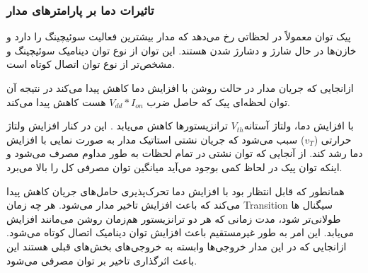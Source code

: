 \subsubsection{تاثیرات دما بر پارامتر‌های مدار}


پیک توان معمولاً در لحظاتی رخ می‌دهد که مدار بیشترین فعالیت سوئیچینگ را دارد و خازن‌ها در حال شارژ و دشارژ شدن هستند. این توان از نوع توان دینامیک سوئیچینگ و مشخص‌تر از نوع توان اتصال کوتاه است.

ازانجایی که جریان مدار در حالت روشن با افزایش دما کاهش پیدا می‌کند در نتیجه آن توان لحظه‌ای پیک که حاصل ضرب $V_{dd} * I_{on}$ هست کاهش پیدا می‌کند.



با افزایش دما، ولتاژ آستانه$V_{th}$ ترانزیستورها کاهش می‌یابد .
این در کنار افزایش ولتاژ حرارتی ($v_T$) سبب می‌شود که جریان نشتی استاتیک مدار به صورت نمایی با افزایش دما رشد کند.
از آنجایی که توان نشتی در تمام لحظات به طور مداوم مصرف می‌شود و اینکه توان پیک در لحاظ کمی بوجود می‌آید میانگین توان مصرفی کل را بالا می‌برد.



همانطور که قابل انتظار بود با افزایش دما تحرک‌پذیری حامل‌های جریان کاهش پیدا می‌کند که باعث افزایش تاخیر مدار می‌شود.
هر چه زمان Transition سیگنال ها طولانی‌تر شود، مدت زمانی که هر دو ترانزیستور هم‌زمان روشن می‌مانند افزایش می‌یابد.
این امر به طور غیرمستقیم باعث افزایش توان دینامیک اتصال کوتاه می‌شود.
ازانجایی که در این مدار خروجی‌ها وابسته به خروجی‌های بخش‌های قبلی هستند این باعث اثر‌گذاری تاخیر بر توان مصرفی می‌شود.



